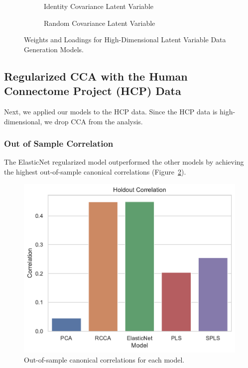 \begin{figure}
\centering
\begin{subfigure}{0.49\linewidth}
\centering

\caption{Identity Covariance Latent Variable}
\end{subfigure}
%
\begin{subfigure}{0.49\linewidth}
\centering

\caption{Random Covariance Latent Variable}
\end{subfigure}
\caption{Weights and Loadings for High-Dimensional Latent Variable Data Generation Models.}
    \label{fig:latent-variable-weights-loadings-high}
\end{figure}

\subsection{Regularized CCA with the Human Connectome Project (HCP) Data}

Next, we applied our models to the HCP data. Since the HCP data is high-dimensional, we drop CCA from the analysis.

\subsubsection{Out of Sample Correlation}

The ElasticNet regularized model outperformed the other models by achieving the highest out-of-sample canonical correlations (Figure~\ref{fig:performance}).

\begin{figure}
\centering
\includegraphics[width=0.5\linewidth]{figures/regularization/hcp/holdout_correlations.pdf}
\caption{Out-of-sample canonical correlations for each model.}
\label{fig:performance}
\end{figure}

